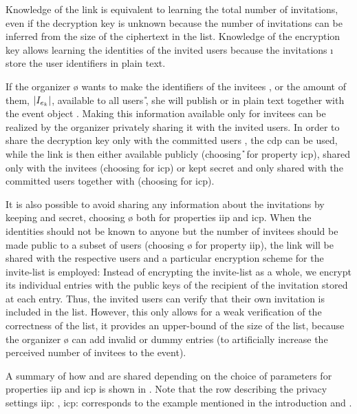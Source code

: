 Knowledge of the link \ILL{} is equivalent to learning the total number of invitations, 
even if the decryption key \ILK{} is unknown because the number of invitations can 
be inferred from the size of the ciphertext in the list.  
Knowledge of the encryption key \ILK{} allows learning the identities of the invited 
users \I{} because the invitations \i{} store the user identifiers in plain text.

If the organizer \o{} wants to make the identifiers of the invitees \I{}, or the 
amount of them, \ie $|\I{}|$, available to all users \U{}, she will publish 
\ILL{} or \ILK{} in plain text together with the event object \eo{}. Making this 
information available only for invitees \I{} can be realized
by the organizer privately sharing it with the invited users.
%
In order to share the decryption key \ILK{} only with the committed
users \C{}, the \acl{cdp} can be used, while the link \ILL{} 
is then either available publicly (\ie choosing \U{} for property \Ac{icp}), shared only 
with the invitees (\ie choosing \I{} for \Ac{icp}) or kept secret and only 
shared with the committed users together with \ILK{} (\ie choosing \C{} for 
\Ac{icp}). 

It is also possible to avoid sharing any information about the invitations by keeping 
\ILL{} and \ILK{} secret, \ie choosing \o{} both for properties \Ac{iip} and \Ac{icp}. 
When the identities should not be known to anyone but the number of invitees 
should be made public to a subset of users (\ie choosing \o{} for property \Ac{iip}), 
the link \ILL{} will be shared with the respective users and a particular encryption 
scheme for the invite-list is employed:
%
Instead of encrypting the invite-list as a whole, we encrypt its individual 
entries with the public keys of the recipient of the invitation stored at each entry. 
Thus, the invited users can verify that their own invitation is
included in the list. However, this only allows for a weak verification of the correctness 
of the list, \ie it provides an upper-bound of the size of the list, because the 
organizer \o{} can add invalid or dummy entries (\eg to artificially increase the 
perceived number of invitees to the event).

A summary of how \ILL{} and \ILK{} are shared depending on the choice of parameters 
for properties \Ac{iip} and \Ac{icp} is shown in .
Note that the row describing the privacy settings \Ac{iip}: \C,
\Ac{icp}: \I corresponds to the example mentioned in the introduction
and .

